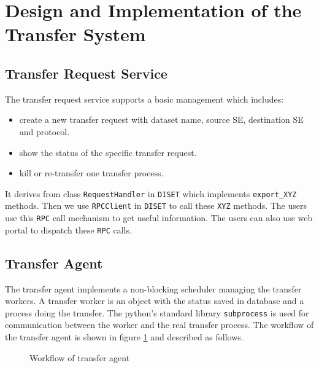 \section{Design and Implementation of the Transfer System}

\subsection{Transfer Request Service}

The transfer request service supports a basic management which includes:
\begin{itemize}
    \item create a new transfer request with dataset name,
          source SE, destination SE and protocol.
    \item show the status of the specific transfer request.
    \item kill or re-transfer one transfer process.
\end{itemize}
It derives from class {\tt RequestHandler} in {\tt DISET}
which implements \verb"export_XYZ" methods.
Then we use {\tt RPCClient} in {\tt DISET} to call these \verb"XYZ"
methods. The users use this {\tt RPC} call mechanism to get useful
information. The users can also use web portal to dispatch these
{\tt RPC} calls.
%
\subsection{Transfer Agent}
%
The transfer agent implements a non-blocking scheduler 
managing the transfer workers. A transfer worker is an object with
the status saved in database and a process doing the transfer.
The python's standard library {\tt subprocess} is used for communication
between the worker and the real transfer process.
%
The workflow of the transfer agent is shown in figure \ref{fig:agent}
and described as follows.
\begin{figure}[htbp]
    
    \caption{Workflow of transfer agent} \label{fig:agent}
\end{figure}

